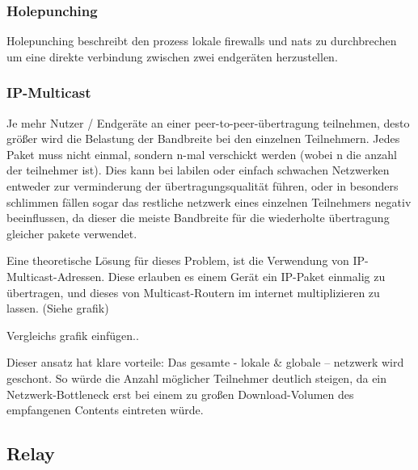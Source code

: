 \documentclass{article}
\begin{document}
\begin{onecolumn}

\subsubsection{Holepunching}
Holepunching beschreibt den prozess lokale firewalls und nats zu durchbrechen
um eine direkte verbindung zwischen zwei endgeräten herzustellen.


\subsubsection{IP-Multicast}

Je mehr Nutzer / Endgeräte an einer peer-to-peer-übertragung teilnehmen, desto
größer wird die Belastung der Bandbreite bei den einzelnen Teilnehmern. Jedes
Paket muss nicht einmal, sondern n-mal verschickt werden (wobei n die anzahl
der teilnehmer ist). Dies kann bei labilen oder einfach schwachen Netzwerken
entweder zur verminderung der übertragungsqualität führen, oder in besonders
schlimmen fällen sogar das restliche netzwerk eines einzelnen Teilnehmers
negativ beeinflussen, da dieser die meiste Bandbreite für die wiederholte
übertragung gleicher pakete verwendet.

Eine theoretische Lösung für dieses Problem, ist die Verwendung von
IP-Multicast-Adressen. Diese erlauben es einem Gerät ein IP-Paket einmalig zu
übertragen, und dieses von Multicast-Routern im internet multiplizieren zu
lassen. (Siehe grafik)

Vergleichs grafik einfügen..

Dieser ansatz hat klare vorteile: Das gesamte - lokale \& globale – netzwerk
wird geschont. So würde die Anzahl möglicher Teilnehmer deutlich steigen, da
ein Netzwerk-Bottleneck erst bei einem zu großen Download-Volumen des
empfangenen Contents eintreten würde.

\subsection{Relay}


\end{onecolumn}
\end{document}
